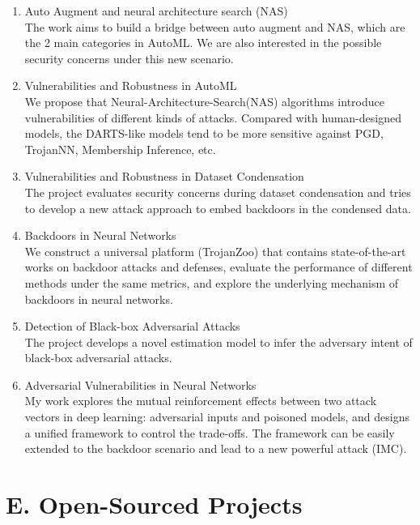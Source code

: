 \documentclass{resume}
\begin{document}
\begin{resume}
\begin{enumerate}[labelsep=15pt, parsep=8pt]

\item Auto Augment and neural architecture search (NAS)\\
The work aims to build a bridge between auto augment and NAS, which are the 2 main categories in AutoML. We are also interested in the possible security concerns under this new scenario.

\item Vulnerabilities and Robustness in AutoML\\
We propose that Neural-Architecture-Search(NAS) algorithms introduce vulnerabilities of different kinds of attacks. Compared with human-designed models, the DARTS-like models tend to be more sensitive against PGD, TrojanNN, Membership Inference, etc.

\item Vulnerabilities and Robustness in Dataset Condensation\\
The project evaluates security concerns during dataset condensation and tries to develop a new attack approach to embed backdoors in the condensed data. 

\item Backdoors in Neural Networks\\
We construct a universal platform (TrojanZoo) that contains state-of-the-art works on backdoor attacks and defenses, evaluate the performance of different methods under the same metrics, and explore the underlying mechanism of backdoors in neural networks.

\item Detection of Black-box Adversarial Attacks\\
The project develops a novel estimation model to infer the adversary intent of black-box adversarial attacks.

\item Adversarial Vulnerabilities in Neural Networks\\
My work explores the mutual reinforcement effects between two attack vectors in deep learning: adversarial inputs and poisoned models, and designs a unified framework to control the trade-offs. The framework can be easily extended to the backdoor scenario and lead to a new powerful attack (IMC).

\end{enumerate}

\section{E. Open-Sourced Projects}
\vspace{8pt}


\end{resume}
\end{document}
